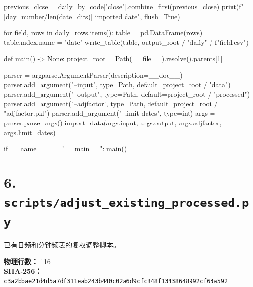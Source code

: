 \documentclass[UTF8,a4paper,fontset=fandol]{ctexart}
\begin{document}
\begin{ProjectCode}
        previous_close = daily_by_code["close"].combine_first(previous_close)
        print(f"[{day_number}/{len(date_dirs)}] imported {date}", flush=True)

    for field, rows in daily_rows.items():
        table = pd.DataFrame(rows)
        table.index.name = "date"
        write_table(table, output_root / "daily" / f"{field}.csv")


def main() -> None:
    project_root = Path(__file__).resolve().parents[1]

    parser = argparse.ArgumentParser(description=__doc__)
    parser.add_argument("--input", type=Path, default=project_root / "data")
    parser.add_argument("--output", type=Path, default=project_root / "processed")
    parser.add_argument("--adjfactor", type=Path, default=project_root / "adjfactor.pkl")
    parser.add_argument("--limit-dates", type=int)
    args = parser.parse_args()
    import_data(args.input, args.output, args.adjfactor, args.limit_dates)


if __name__ == "__main__":
    main()
\end{ProjectCode}
\clearpage
\section{6. \texttt{scripts/adjust\_existing\_processed.py}}
已有日频和分钟频表的复权调整脚本。

\textbf{物理行数：} 116\\
\textbf{SHA-256：} \texttt{c3a2bbae21d4d5a7df311eab243b440c02a6d9cfc848f13438648992cf63a592}
\end{document}
